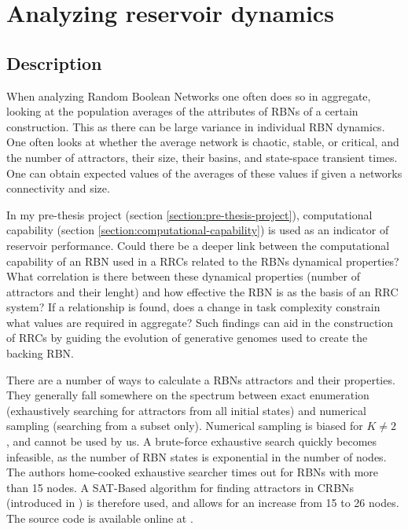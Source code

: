 \section{Analyzing reservoir dynamics}
\label{section:reservoir-dynamics}

\subsection{Description}

When analyzing Random Boolean Networks one often does so in aggregate,
looking at the population averages of the attributes of RBNs of a certain construction.
This as there can be large variance in individual RBN dynamics.
One often looks at whether the average network is chaotic, stable, or critical,
and the number of attractors, their size, their basins, and state-space transient times.
One can obtain expected values of the averages of these values if given a networks connectivity and size.

In my pre-thesis project (section \ref{section:pre-thesis-project}),
computational capability (section \ref{section:computational-capability}) is used as an indicator of reservoir performance.
Could there be a deeper link between the computational capability of an RBN used in a RRCs related to the RBNs dynamical properties?
What correlation is there between these dynamical properties (number of attractors and their lenght)
and how effective the RBN is as the basis of an RRC system?
If a relationship is found, does a change in task complexity constrain what values are required in aggregate?
Such findings can aid in the construction of RRCs by guiding the evolution of generative genomes used to create the backing RBN.

There are a number of ways to calculate a RBNs attractors and their properties.
They generally fall somewhere on the spectrum between exact enumeration (exhaustively searching for attractors from all initial states) and numerical sampling (searching from a subset only).
Numerical sampling is biased for $K\neq2$ \cite{berdahl2009random}, and cannot be used by us.
A brute-force exhaustive search quickly becomes infeasible, as the number of RBN states is exponential in the number of nodes.
The authors home-cooked exhaustive searcher times out for RBNs with more than 15 nodes.
A SAT-Based algorithm for finding attractors in CRBNs (introduced in \cite{dubrova2011sat}) is therefore used,
and allows for an increase from 15 to 26 nodes.
The source code is available online at \cite{dubrova2011sat-online}.

